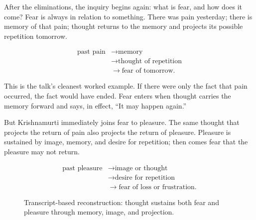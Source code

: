 \documentclass[11pt,oneside]{book}
\begin{document}
After the eliminations, the inquiry begins again: what is fear, and how does it come? Fear is always in relation to something. There was pain yesterday; there is memory of that pain; thought returns to the memory and projects its possible repetition tomorrow.

\begin{align}
\text{past pain}
&\longrightarrow \text{memory}\\
&\longrightarrow \text{thought of repetition}\\
&\longrightarrow \text{fear of tomorrow}.
\end{align}

This is the talk's cleanest worked example. If there were only the fact that pain occurred, the fact would have ended. Fear enters when thought carries the memory forward and says, in effect, ``It may happen again.''

But Krishnamurti immediately joins fear to pleasure. The same thought that projects the return of pain also projects the return of pleasure. Pleasure is sustained by image, memory, and desire for repetition; then comes fear that the pleasure may not return.

\begin{align}
\text{past pleasure}
&\longrightarrow \text{image or thought}\\
&\longrightarrow \text{desire for repetition}\\
&\longrightarrow \text{fear of loss or frustration}.
\end{align}

\begin{figure}
\centering
{}

Transcript-based reconstruction: thought sustains both fear and pleasure through memory, image, and projection.
\end{figure}
\end{document}
